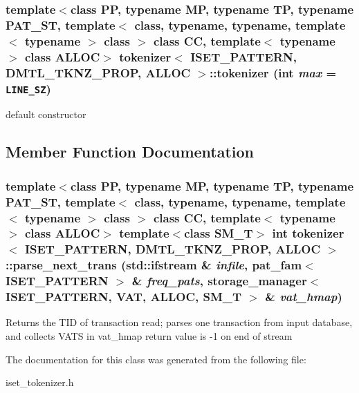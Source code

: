 \subsubsection{\setlength{\rightskip}{0pt plus 5cm}template$<$class PP, typename MP, typename TP, typename PAT\_\-ST, template$<$ class, typename, typename, template$<$ typename $>$ class $>$ class CC, template$<$ typename $>$ class ALLOC$>$ \bf{tokenizer}$<$ ISET\_\-PATTERN, DMTL\_\-TKNZ\_\-PROP, ALLOC $>$::\bf{tokenizer} (int {\em max} = {\tt LINE\_\-SZ})\hspace{0.3cm}{\tt  [inline]}}\label{classtokenizer_3_01ISET__PATTERN_00_01DMTL__TKNZ__PROP_00_01ALLOC_01_4_966ef0603dfdd9535a748dcaa003570c}


default constructor 

\subsection{Member Function Documentation}
\subsubsection{\setlength{\rightskip}{0pt plus 5cm}template$<$class PP, typename MP, typename TP, typename PAT\_\-ST, template$<$ class, typename, typename, template$<$ typename $>$ class $>$ class CC, template$<$ typename $>$ class ALLOC$>$ template$<$class SM\_\-T$>$ int \bf{tokenizer}$<$ ISET\_\-PATTERN, DMTL\_\-TKNZ\_\-PROP, ALLOC $>$::parse\_\-next\_\-trans (std::ifstream \& {\em infile}, \bf{pat\_\-fam}$<$ ISET\_\-PATTERN $>$ \& {\em freq\_\-pats}, \bf{storage\_\-manager}$<$ ISET\_\-PATTERN, \bf{VAT}, ALLOC, SM\_\-T $>$ \& {\em vat\_\-hmap})\hspace{0.3cm}{\tt  [inline]}}\label{classtokenizer_3_01ISET__PATTERN_00_01DMTL__TKNZ__PROP_00_01ALLOC_01_4_158ed911fe33b11e01923c50c103fbb8}


Returns the TID of transaction read; parses one transaction from input database, and collects VATS in vat\_\-hmap return value is -1 on end of stream 

The documentation for this class was generated from the following file:\begin{CompactItemize}
\item 
iset\_\-tokenizer.h\end{CompactItemize}
